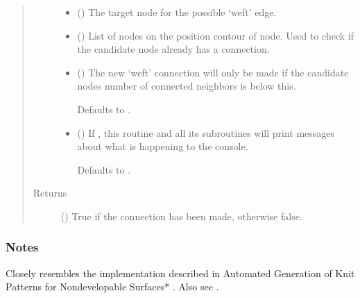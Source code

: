 \documentclass[letterpaper,10pt,english]{sphinxmanual}
\begin{document}
\begin{fulllineitems}
\begin{fulllineitems}
\begin{quote}
\begin{description}
\begin{itemize}
\item {} 
 () \textendash{} The target node for the possible ‘weft’ edge.

\item {} 
 () \textendash{} List of nodes on the position contour of node. Used to check if
the candidate node already has a connection.

\item {} 
 (\sphinxstyleliteralemphasis{\sphinxupquote{, }}) \textendash{} 
The new ‘weft’ connection will only be made if the candidate nodes
number of connected neighbors is below this.

Defaults to .


\item {} 
 (\sphinxstyleliteralemphasis{\sphinxupquote{, }}) \textendash{} 
If , this routine and all its subroutines will print
messages about what is happening to the console.

Defaults to .


\end{itemize}

\item[{Returns}] \leavevmode
{} () \textendash{} True if the connection has been made, otherwise false.

\end{description}\end{quote}
\subsubsection*{Notes}

Closely resembles the implementation described in Automated Generation
of Knit Patterns for Non\sphinxhyphen{}developable Surfaces* \sphinxfootnotemark[1]. Also see  \sphinxfootnotemark[2].


\end{fulllineitems}
\end{fulllineitems}
\end{document}
